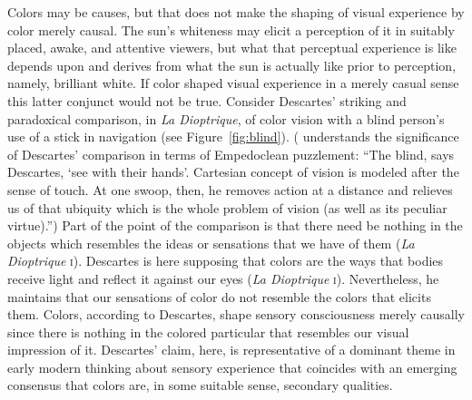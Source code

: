 Colors may be causes, but that does not make the shaping of visual experience by color merely causal. The sun's whiteness may elicit a perception of it in suitably placed, awake, and attentive viewers, but what that perceptual experience is like depends upon and derives from what the sun is actually like prior to perception, namely, brilliant white. If color shaped visual experience in a merely casual sense this latter conjunct would not be true. Consider Descartes' striking and paradoxical comparison, in \emph{La Dioptrique}, of color vision with a blind person's use of a stick in navigation (see Figure~\ref{fig:blind}). (\citealt[170]{Merleau-Ponty:1964aa} understands the significance of Descartes' comparison in terms of Empedoclean puzzlement: ``The blind, says Descartes, `see with their hands'. Cartesian concept of vision is modeled after the sense of touch. At one swoop, then, he removes action at a distance and relieves us of that ubiquity which is the whole problem of vision (as well as its peculiar virtue).'') Part of the point of the comparison is that there need be nothing in the objects which resembles the ideas or sensations that we have of them (\emph{La Dioptrique} \textsc{i}). Descartes is here supposing that colors are the ways that bodies receive light and reflect it against our eyes (\emph{La Dioptrique} \textsc{i}). Nevertheless, he maintains that our sensations of color do not resemble the colors that elicits them. Colors, according to Descartes, shape sensory consciousness merely causally since there is nothing in the colored particular that resembles our visual impression of it. Descartes' claim, here, is representative of a dominant theme in early modern thinking about sensory experience that coincides with an emerging consensus that colors are, in some suitable sense, secondary qualities.

